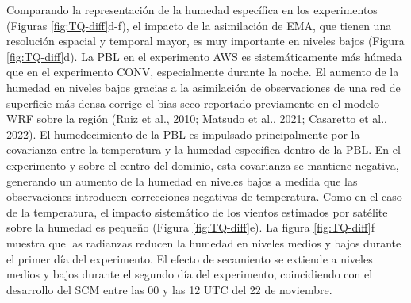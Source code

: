 \documentclass[12pt,oneside,a4paper]{reedthesis}
\begin{document}
Comparando la representación de la humedad específica en los experimentos (Figuras \ref{fig:TQ-diff}d-f), el impacto de la asimilación de EMA, que tienen una resolución espacial y temporal mayor, es muy importante en niveles bajos (Figura \ref{fig:TQ-diff}d). La PBL en el experimento AWS es sistemáticamente más húmeda que en el experimento CONV, especialmente durante la noche. El aumento de la humedad en niveles bajos gracias a la asimilación de observaciones de una red de superficie más densa corrige el bias seco reportado previamente en el modelo WRF sobre la región (Ruiz et al., 2010; Matsudo et al., 2021; Casaretto et al., 2022). El humedecimiento de la PBL es impulsado principalmente por la covarianza entre la temperatura y la humedad específica dentro de la PBL. En el experimento y sobre el centro del dominio, esta covarianza se mantiene negativa, generando un aumento de la humedad en niveles bajos a medida que las observaciones introducen correcciones negativas de temperatura. Como en el caso de la temperatura, el impacto sistemático de los vientos estimados por satélite sobre la humedad es pequeño (Figura \ref{fig:TQ-diff}e). La figura \ref{fig:TQ-diff}f muestra que las radianzas reducen la humedad en niveles medios y bajos durante el primer día del experimento. El efecto de secamiento se extiende a niveles medios y bajos durante el segundo día del experimento, coincidiendo con el desarrollo del SCM entre las 00 y las 12 UTC del 22 de noviembre.
\end{document}
